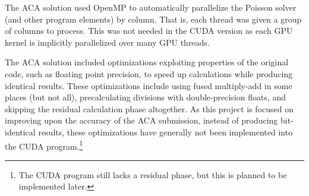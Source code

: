 The ACA solution used OpenMP\cite{OpenMPHomeOpenMP} to automatically parallelize the Poisson solver (and other program elements) by column.
That is, each thread was given a group of columns to process.
This was not needed in the CUDA version as each GPU kernel is implicitly parallelized over many GPU threads.

The ACA solution included optimizations exploiting properties of the original code, such as floating point precision, to speed up calculations while producing identical results.
These optimizations include using fused multiply-add\cite{Muller2010TheInstruction} in some places (but not all), precalculating divisions with double-precision floats, and skipping the residual calculation phase altogether.
As this project is focused on improving upon the accuracy of the ACA submission, instead of producing bit-identical results, these optimizations have generally not been implemented into the CUDA program.\footnote{The CUDA program still lacks a residual phase, but this is planned to be implemented later.\label{sec:OptimizationReAddingResidual}}




